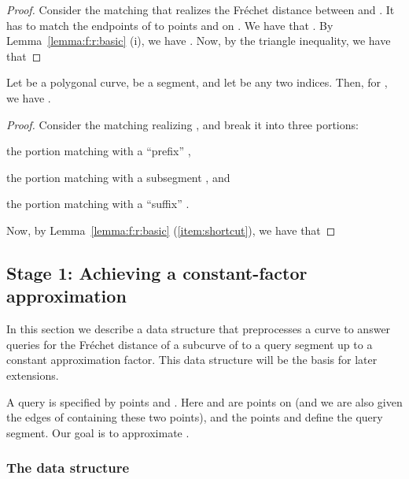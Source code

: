 \documentclass[12pt]{article}
\newcommand{\seclab}[1]{\label{sec:#1}}
\newcommand{\lemlab}[1]{\label{lemma:#1}}
\newcommand{\lemref}[1]{Lemma~\ref{lemma:#1}}
\newcommand{\itemref}[1]{(\ref{item:#1})}
\newcommand{\aftermathA}{\par\vspace{-\baselineskip}}
\newcommand{\Frechet}{Fr\'{e}c{h}e{}t\xspace}\providecommand{\Arr}{\mathop{\mathrm{\EuScript{A}}}}
\numberwithin{figure}{section}
\numberwithin{equation}{section}
\newcommand{\matching}{matching\xspace}
\begin{document}
\begin{proof}
    Consider the \matching{} that realizes the \Frechet distance
    between  and . It has to match the endpoints of
     to points  and  on .  We have
    that .  By \lemref{f:r:basic} (i), we have
    .
    Now, by the triangle inequality, we have that
    
    \aftermathA
\end{proof}

\begin{lemma}
    \lemlab{shortcut:segment}Let  be a polygonal curve, 
    be a segment, and let  be any two indices. Then, for , we have .
\end{lemma}

\begin{proof}
    Consider the \matching{} realizing ,
    and break it into three portions:
    \begin{compactitem}
        \item the portion matching  with a
        ``prefix'' ,
        \item the portion matching  with a
        subsegment , and
        \item the portion matching  with a
        ``suffix'' .
    \end{compactitem}
    Now, by \lemref{f:r:basic} \itemref{shortcut}, we have that
    
    \aftermathA
\end{proof}




\subsection{Stage 1: Achieving a constant-factor approximation}
\seclab{f:r:query:constant}\seclab{queries:stage:one}


In this section we describe a data structure that preprocesses a curve
 to answer queries for the \Frechet distance of a subcurve of
 to a query segment up to a constant approximation factor. This
data structure will be the basis for later extensions.

A query is specified by points  and . Here  and
 are points on  (and we are also given the edges of 
containing these two points), and the points  and  define
the query segment. Our goal is to approximate .

\subsubsection{The data structure}
\end{document}

